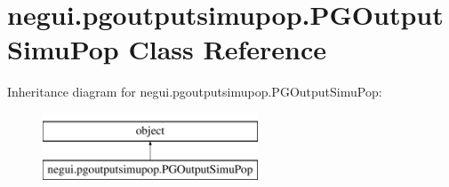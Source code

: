\hypertarget{classnegui_1_1pgoutputsimupop_1_1PGOutputSimuPop}{}\section{negui.\+pgoutputsimupop.\+P\+G\+Output\+Simu\+Pop Class Reference}
\label{classnegui_1_1pgoutputsimupop_1_1PGOutputSimuPop}
Inheritance diagram for negui.\+pgoutputsimupop.\+P\+G\+Output\+Simu\+Pop\+:\begin{figure}[H]
\begin{center}
\leavevmode
\includegraphics[height=2.000000cm]{classnegui_1_1pgoutputsimupop_1_1PGOutputSimuPop}
\end{center}
\end{figure}
